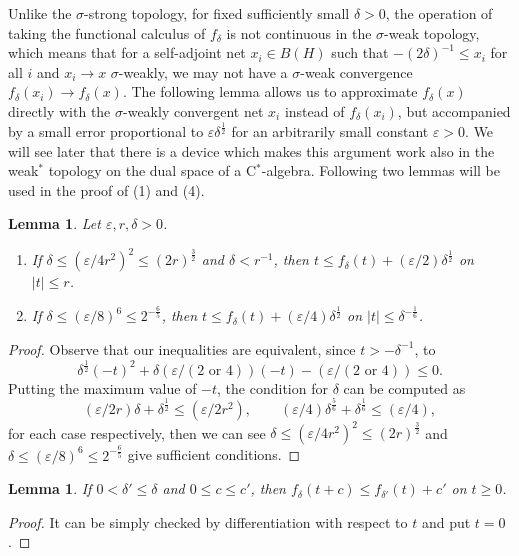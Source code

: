 \documentclass[noamsfonts,a4paper,10pt]{amsart}
\theoremstyle{plain}
\newtheorem{lem}[thm]{Lemma}
\theoremstyle{definition}
\theoremstyle{remark}
\begin{document}
Unlike the $\sigma$-strong topology, for fixed sufficiently small $\delta>0$, the operation of taking the functional calculus of $f_\delta$ is not continuous in the $\sigma$-weak topology, which means that for a self-adjoint net $x_i\in B(H)$ such that $-(2\delta)^{-1}\le x_i$ for all $i$ and $x_i\to x$ $\sigma$-weakly, we may not have a $\sigma$-weak convergence $f_\delta(x_i)\to f_\delta(x)$.
The following lemma allows us to approximate $f_\delta(x)$ directly with the $\sigma$-weakly convergent net $x_i$ instead of $f_\delta(x_i)$, but accompanied by a small error proportional to $\varepsilon\delta^{\frac12}$ for an arbitrarily small constant $\varepsilon>0$.
We will see later that there is a device which makes this argument work also in the weak$^*$ topology on the dual space of a C$^*$-algebra.
Following two lemmas will be used in the proof of (1) and (4).
\begin{lem}\label{f}
Let $\varepsilon,r,\delta>0$.
\begin{enumerate}
\item If $\delta\le(\varepsilon/4r^2)^2\le(2r)^{\frac32}$ and $\delta<r^{-1}$, then $t\le f_\delta(t)+(\varepsilon/2)\delta^{\frac12}$ on $|t|\le r$.
\item If $\delta\le(\varepsilon/8)^6\le2^{-\frac65}$, then $t\le f_\delta(t)+(\varepsilon/4)\delta^{\frac12}$ on $|t|\le\delta^{-\frac16}$.
\end{enumerate}
\end{lem}
\begin{proof}
Observe that our inequalities are equivalent, since $t>-\delta^{-1}$, to
\[\delta^{\frac12}(-t)^2+\delta(\varepsilon/(2\text{ or }4))(-t)-(\varepsilon/(2\text{ or }4))\le0.\]
Putting the maximum value of $-t$, the condition for $\delta$ can be computed as
\[(\varepsilon/2r)\delta+\delta^{\frac12}\le(\varepsilon/2r^2),\qquad(\varepsilon/4)\delta^{\frac56}+\delta^{\frac16}\le(\varepsilon/4),\]
for each case respectively, then we can see $\delta\le(\varepsilon/4r^2)^2\le(2r)^{\frac32}$ and $\delta\le(\varepsilon/8)^6\le2^{-\frac65}$ give sufficient conditions.
\end{proof}
\begin{lem}\label{f2}
If $0<\delta'\le\delta$ and $0\le c\le c'$, then $f_\delta(t+c)\le f_{\delta'}(t)+c'$ on $t\ge0$.
\end{lem}
\begin{proof}
It can be simply checked by differentiation with respect to $t$ and put $t=0$.
\end{proof}
\end{document}
